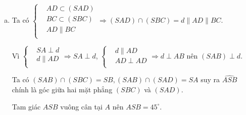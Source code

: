 \begin{bt}
{\begin{enumerate}[a.]
			\item Ta có $\left\{\begin{aligned}
				& AD\subset \left(SAD \right) \\ 
				& BC\subset \left(SBC \right) \\ 
				& AD\parallel BC \\ 
			\end{aligned} \right.\Rightarrow \left(SAD \right)\cap \left(SBC \right)=d\parallel AD\parallel BC$.
			
			Vì $\left\{\begin{aligned}
				& SA\perp d \\ 
				& d\parallel AD \\ 
			\end{aligned} \right.\Rightarrow SA\perp d$, $\left\{\begin{aligned}
				& d\parallel AD \\ 
				& AD\perp AD \\ 
			\end{aligned} \right.\Rightarrow d\perp AB$ nên $(SAB)\perp d$.
			
			Ta có $(SAB)\cap (SBC)=SB,(SAB)\cap (SAD)=SA$ suy ra $\widehat{ASB}$ chính là góc giữa hai mặt phẳng $(SBC)$ và $(SAD)$.
			
			Tam giác $ASB$ vuông cân tại $A$ nên $\widehat{ASB}={45^\circ}$.
		\end{enumerate}
		
	}
	
\end{bt}

